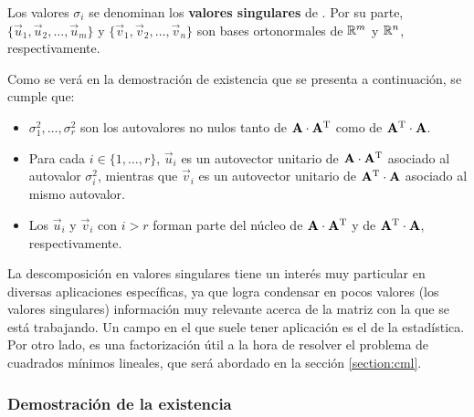 Los valores $\sigma_i$ se denominan los \textbf{valores singulares} de
. Por su parte, $\lbrace \vec{u}_1, \vec{u}_2, \dots, \vec{u}_m
\rbrace$ y $\lbrace \vec{v}_1, \vec{v}_2, \dots, \vec{v}_n \rbrace$ son bases
ortonormales de $\mathbb{R}^m$ y $\mathbb{R}^n$, respectivamente.

Como se verá en la demostración de existencia que se presenta a continuación,
se cumple que:
\begin{itemize}
\item $\sigma_1^2, \dots, \sigma_r^2$ son los autovalores no nulos tanto de
    $\mathbf{A} \cdot \mathbf{A}^{\mathrm{T}}$ como de $\mathbf{A}^{\mathrm{T}} \cdot \mathbf{A}$.
\item Para cada $i \in \{1, \dots, r\}$, $\vec{u}_i$ es un autovector unitario
    de $\mathbf{A} \cdot \mathbf{A}^{\mathrm{T}}$ asociado al autovalor $\sigma_i^2$,
    mientras que $\vec{v}_i$ es un autovector unitario de $\mathbf{A}^{\mathrm{T}} \cdot
    \mathbf{A}$ asociado al mismo autovalor.
\item Los $\vec{u}_i$ y $\vec{v}_i$ con $i > r$ forman parte del núcleo de
    $\mathbf{A} \cdot \mathbf{A}^{\mathrm{T}}$ y de $\mathbf{A}^{\mathrm{T}} \cdot \mathbf{A}$,
    respectivamente.
\end{itemize}

La descomposición en valores singulares tiene un interés muy particular en
diversas aplicaciones específicas, ya que logra condensar en pocos valores
(los valores singulares) información muy relevante acerca de la matriz con la que se está trabajando. Un campo en el que suele tener aplicación es el de la
estadística. Por otro lado, es una factorización útil a la hora de resolver
el problema de cuadrados mínimos lineales, que será abordado en la sección
\ref{section:cml}.

\subsubsection{Demostración de la existencia}

